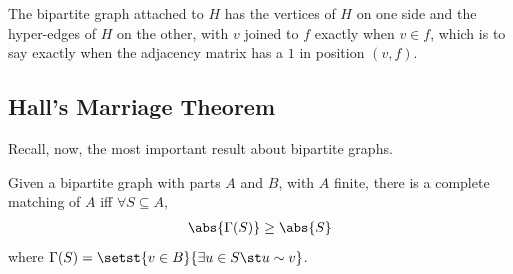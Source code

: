 The bipartite graph attached to $H$ has the vertices of $H$ on one side and the hyper-edges of $H$ on the other, with $v$ joined to $f$ exactly when $v \in f$, which is to say exactly when the adjacency matrix has a $1$ in position $(v, f)$.

\subsection{Hall's Marriage Theorem}

Recall, now, the most important result about bipartite graphs.

\begin{boxtheorem} \label{Ch2:Thm:Hall}
    Given a bipartite graph with parts $A$ and $B$, with $A$ finite, there is a complete matching of $A$ iff $\forall S \subseteq A$,
    \begin{align*}
        \abs{\Gamma(S)} \geq \abs{S}
    \end{align*}
    where $\Gamma(S) = \setst{v \in B}{\exists u \in S \st u \sim v}$.
\end{boxtheorem}
